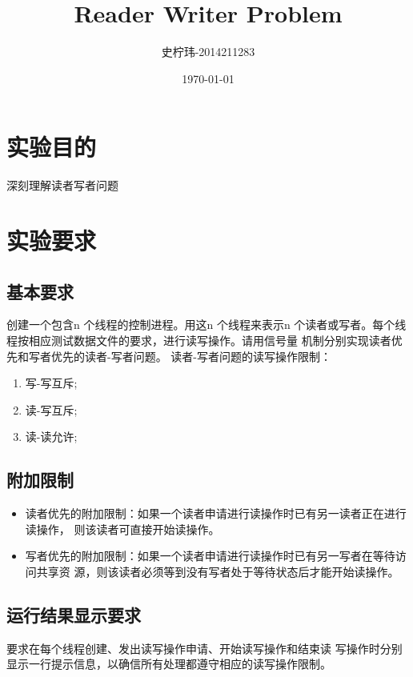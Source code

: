 \documentclass{article}
\begin{document}
\title{Reader Writer Problem}
\author{史柠玮-2014211283}
\date{\today}
\maketitle
\tableofcontents
\pagebreak

\section{实验目的}
深刻理解读者写者问题

\section{实验要求}

\subsection{基本要求}

创建一个包含n 个线程的控制进程。用这n 个线程来表示n
个读者或写者。每个线程按相应测试数据文件的要求，进行读写操作。请用信号量
机制分别实现读者优先和写者优先的读者-写者问题。
读者-写者问题的读写操作限制：
\begin{enumerate}
\item 写-写互斥;
\item 读-写互斥;
\item 读-读允许;
\end{enumerate}


\subsection{附加限制}
\begin{itemize}
\item 读者优先的附加限制：如果一个读者申请进行读操作时已有另一读者正在进行读操作，
则该读者可直接开始读操作。
\item 写者优先的附加限制：如果一个读者申请进行读操作时已有另一写者在等待访问共享资
源，则该读者必须等到没有写者处于等待状态后才能开始读操作。
\end{itemize}



\subsection{运行结果显示要求}

要求在每个线程创建、发出读写操作申请、开始读写操作和结束读
写操作时分别显示一行提示信息，以确信所有处理都遵守相应的读写操作限制。
\end{document}
